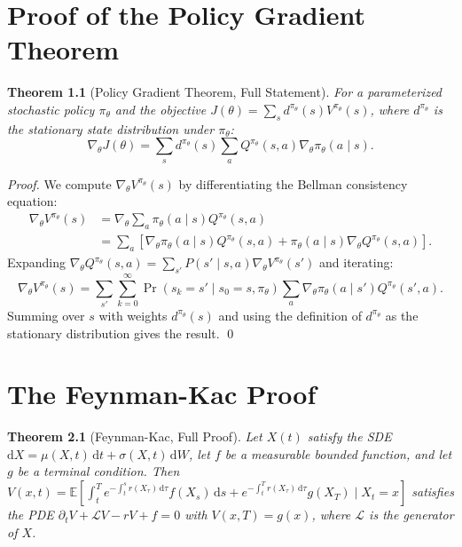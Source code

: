 \documentclass[12pt, a4paper, openany]{book}
\theoremstyle{plain}
\newtheorem{theorem}{Theorem}[chapter]
\theoremstyle{definition}
\theoremstyle{remark}
\begin{document}
\chapter{Proof of the Policy Gradient Theorem}

\begin{theorem}[Policy Gradient Theorem, Full Statement]
For a parameterized stochastic policy $\pi_\theta$ and the objective $J(\theta) = \sum_s d^{\pi_\theta}(s) V^{\pi_\theta}(s)$, where $d^{\pi_\theta}$ is the stationary state distribution under $\pi_\theta$:
\[
\nabla_\theta J(\theta) = \sum_s d^{\pi_\theta}(s) \sum_a Q^{\pi_\theta}(s,a) \nabla_\theta \pi_\theta(a \mid s).
\]
\end{theorem}

\begin{proof}
We compute $\nabla_\theta V^{\pi_\theta}(s)$ by differentiating the Bellman consistency equation:
\begin{align*}
\nabla_\theta V^{\pi_\theta}(s) &= \nabla_\theta \sum_a \pi_\theta(a \mid s) Q^{\pi_\theta}(s,a)\\
&= \sum_a \left[\nabla_\theta \pi_\theta(a \mid s) Q^{\pi_\theta}(s,a) + \pi_\theta(a \mid s) \nabla_\theta Q^{\pi_\theta}(s,a)\right].
\end{align*}
Expanding $\nabla_\theta Q^{\pi_\theta}(s,a) = \sum_{s'} P(s' \mid s,a) \nabla_\theta V^{\pi_\theta}(s')$ and iterating:
\[
\nabla_\theta V^{\pi_\theta}(s) = \sum_{s'} \sum_{k=0}^\infty \Pr(s_k = s' \mid s_0 = s, \pi_\theta) \sum_a \nabla_\theta \pi_\theta(a \mid s') Q^{\pi_\theta}(s',a).
\]
Summing over $s$ with weights $d^{\pi_\theta}(s)$ and using the definition of $d^{\pi_\theta}$ as the stationary distribution gives the result. \qed
\end{proof}

\chapter{The Feynman-Kac Proof}

\begin{theorem}[Feynman-Kac, Full Proof]
Let $X(t)$ satisfy the SDE $\mathrm{d}X = \mu(X,t)\,\mathrm{d}t + \sigma(X,t)\,\mathrm{d}W$, let $f$ be a measurable bounded function, and let $g$ be a terminal condition. Then $V(x,t) = \mathbb{E}[\int_t^T e^{-\int_t^s r(X_\tau)\,\mathrm{d}\tau} f(X_s)\,\mathrm{d}s + e^{-\int_t^T r(X_\tau)\,\mathrm{d}\tau} g(X_T) \mid X_t = x]$ satisfies the PDE $\partial_t V + \mathcal{L} V - rV + f = 0$ with $V(x,T) = g(x)$, where $\mathcal{L}$ is the generator of $X$.
\end{theorem}
\end{document}
